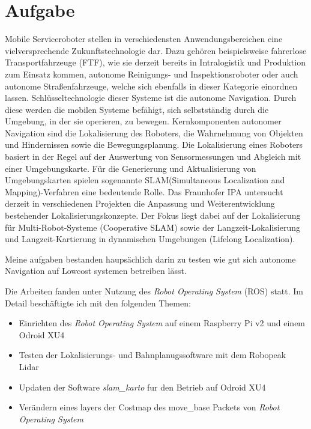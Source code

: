 \chapter{Aufgabe}
Mobile Serviceroboter stellen in verschiedensten Anwendungsbereichen eine vielversprechende Zukunftstechnologie dar. 
Dazu gehören beispielsweise fahrerlose Transportfahrzeuge (FTF), wie sie derzeit bereits in Intralogistik und Produktion zum Einsatz kommen, autonome Reinigungs- und Inspektionsroboter oder auch autonome Straßenfahrzeuge, welche sich ebenfalls in dieser Kategorie einordnen lassen. 
Schlüsseltechnologie dieser Systeme ist die autonome Navigation. 
Durch diese werden die mobilen Systeme befähigt, sich selbstständig durch die Umgebung, in der sie operieren, zu bewegen. 
Kernkomponenten autonomer Navigation sind die Lokalisierung des Roboters, die Wahrnehmung von Objekten und Hindernissen sowie die Bewegungsplanung.
Die Lokalisierung eines Roboters basiert in der Regel auf der Auswertung von Sensormessungen und Abgleich mit einer Umgebungskarte. 
Für die Generierung und Aktualisierung von Umgebungskarten spielen sogenannte SLAM(Simultaneous Localization and Mapping)-Verfahren eine bedeutende Rolle.
Das Fraunhofer IPA untersucht derzeit in verschiedenen Projekten die Anpassung und Weiterentwicklung bestehender Lokalisierungskonzepte. 
Der Fokus liegt dabei auf der Lokalisierung für Multi-Robot-Systeme (Cooperative SLAM) sowie der Langzeit-Lokalisierung und Langzeit-Kartierung in dynamischen Umgebungen (Lifelong Localization).

Meine aufgaben bestanden haupsächlich darin zu testen wie gut sich autonome Navigation auf Lowcost systemen betreiben lässt.

Die Arbeiten fanden unter Nutzung des \emph{Robot Operating System} (ROS)\cite{Quigley-ICRA-2009} statt.
Im Detail beschäftigte ich mit den folgenden Themen:

\begin{itemize}
\item Einrichten des \emph{Robot Operating System} auf einem Raspberry Pi v2 und einem Odroid XU4
\item Testen der Lokalisierungs- und Bahnplanugssoftware mit dem Robopeak Lidar
\item Updaten der Software \emph{slam\_karto} fur den Betrieb auf Odroid XU4
\item Verändern eines layers der Costmap des move\_base Packets von \emph{Robot Operating System}
\end{itemize}

